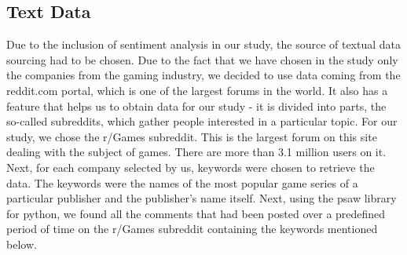\documentclass[11pt]{article} %
\begin{document}
\clearpage

\subsection{Text Data}
Due to the inclusion of sentiment analysis in our study, the source of textual data sourcing had to be chosen. Due to the fact that we have chosen in the study only the companies from the gaming industry, we decided to use data coming from the reddit.com portal, which is one of the largest forums in the world. It also has a feature that helps us to obtain data for our study - it is divided into parts, the so-called subreddits, which gather people interested in a particular topic. For our study, we chose the r/Games subreddit. This is the largest forum on this site dealing with the subject of games. There are more than 3.1 million users on it. Next, for each company selected by us, keywords were chosen to retrieve the data. The keywords were the names of the most popular game series of a particular publisher and the publisher's name itself. Next, using the psaw library for python, we found all the comments that had been posted over a predefined period of time on the r/Games subreddit containing the keywords mentioned below. 
\end{document}

